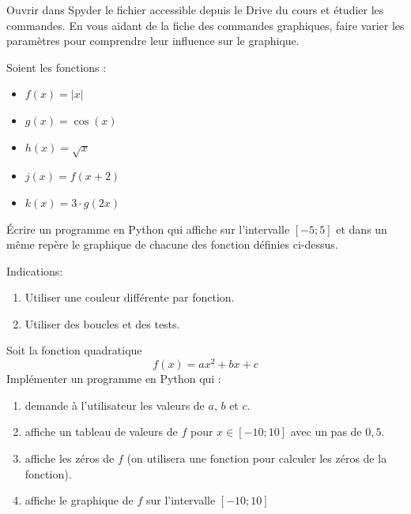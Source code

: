 \bigskip
\begin{boxexstheorieligne}
\exo
Ouvrir dans Spyder le fichier  accessible depuis le Drive du cours et étudier les commandes. En vous aidant de la fiche des commandes graphiques, faire varier les paramètres pour comprendre leur influence sur le graphique.




\eexo
\pagebreak[3]



\exo
Soient les fonctions :

\begin{itemize}
\item $f(x)=\vert x\vert$
\item $g(x)=\cos(x)$
\item $h(x)=\sqrt{x}$
\item $j(x)=f(x+2)$
\item $k(x)=3\cdot g(2x)$
\end{itemize}

Écrire un programme en Python qui affiche sur l'intervalle $[-5;5]$ et dans un même repère le graphique de chacune des fonction définies ci-dessus.


\bigskip
Indications: \begin{minipage}[t][][b]{0.9\textwidth}

\vspace{-4mm}
\begin{enumerate}[label=\alph*),itemsep=0mm]
\item Utiliser une couleur différente par fonction.
\item Utiliser des boucles et des tests.
\end{enumerate}
\end{minipage}




\eexo
\pagebreak[3]



\exo
Soit la fonction quadratique$$f(x)=ax^2+bx+c$$
Implémenter un programme en Python qui :
\begin{enumerate}[label=\roman*),itemsep=2mm]
\item demande à l'utilisateur les valeurs de $a$, $b$ et $c$.
\item affiche un tableau de valeurs de $f$ pour $x\in[-10;10]$ avec un pas de $0,5$.
\item affiche les zéros de $f$ (on utilisera une fonction  pour calculer les zéros de la fonction).
\item affiche le graphique de $f$ sur l'intervalle $[-10;10]$
\end{enumerate}

\end{boxexstheorieligne}

